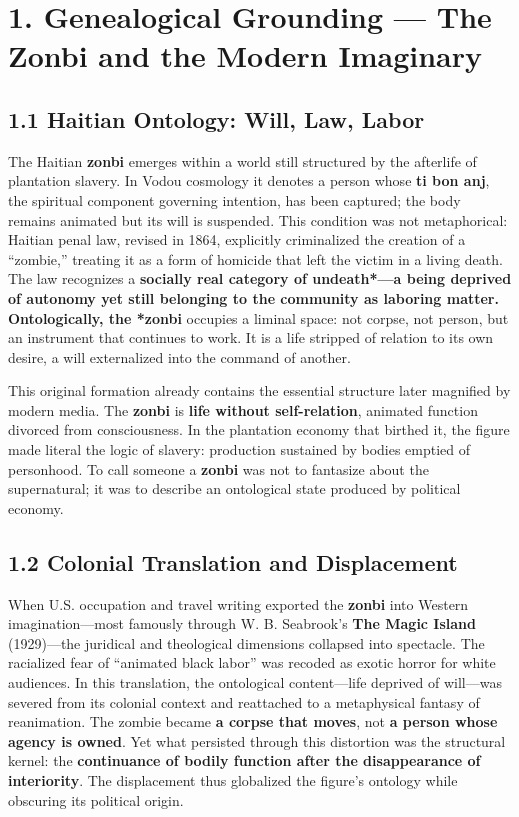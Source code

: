 \documentclass[11pt]{article}
\begin{document}
\section*{1. Genealogical Grounding — The \textbf{Zonbi} and the Modern Imaginary}
\label{sec:orgdf9abab}

\subsection*{1.1 Haitian Ontology: Will, Law, Labor}
\label{sec:orga3a8a63}

The Haitian \textbf{zonbi} emerges within a world still structured by the afterlife of plantation slavery. In Vodou cosmology it denotes a person whose \textbf{ti bon anj}, the spiritual component governing intention, has been captured; the body remains animated but its will is suspended. This condition was not metaphorical: Haitian penal law, revised in 1864, explicitly criminalized the creation of a “zombie,” treating it as a form of homicide that left the victim in a living death. The law recognizes a \textbf{socially real category of undeath*—a being deprived of autonomy yet still belonging to the community as laboring matter. Ontologically, the *zonbi} occupies a liminal space: not corpse, not person, but an instrument that continues to work. It is a life stripped of relation to its own desire, a will externalized into the command of another.

This original formation already contains the essential structure later magnified by modern media. The \textbf{zonbi} is \textbf{life without self-relation}, animated function divorced from consciousness. In the plantation economy that birthed it, the figure made literal the logic of slavery: production sustained by bodies emptied of personhood. To call someone a \textbf{zonbi} was not to fantasize about the supernatural; it was to describe an ontological state produced by political economy.
\subsection*{1.2 Colonial Translation and Displacement}
\label{sec:org98c666f}

When U.S. occupation and travel writing exported the \textbf{zonbi} into Western imagination—most famously through W. B. Seabrook’s \textbf{The Magic Island} (1929)—the juridical and theological dimensions collapsed into spectacle. The racialized fear of “animated black labor” was recoded as exotic horror for white audiences. In this translation, the ontological content—life deprived of will—was severed from its colonial context and reattached to a metaphysical fantasy of reanimation. The zombie became \textbf{a corpse that moves}, not \textbf{a person whose agency is owned}. Yet what persisted through this distortion was the structural kernel: the \textbf{continuance of bodily function after the disappearance of interiority}. The displacement thus globalized the figure’s ontology while obscuring its political origin.
\end{document}
